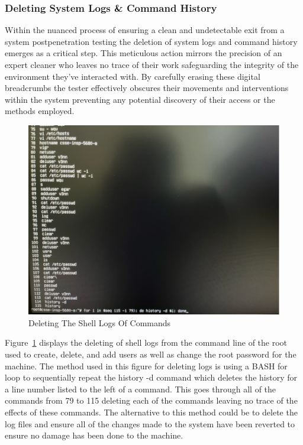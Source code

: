 \documentclass[manuscript,acmsmall,anonymous,review,screen,nonacm=true, authorversion=true]{acmart}
\begin{document}
\subsubsection{ Deleting System Logs \& Command History}
Within the nuanced process of ensuring a clean and undetectable exit from a system postpenetration testing the deletion of system logs and command history emerges as a critical step. This meticulous action mirrors the precision of an expert cleaner who leaves no trace of their
work safeguarding the integrity of the environment they've interacted with.  By carefully
erasing these digital breadcrumbs the tester effectively obscures their movements and
interventions within the system preventing any potential discovery of their access or the methods
employed.
\begin{figure}
    \centering
    \includegraphics{pict/Picture17.png}
    \caption{Deleting The Shell Logs Of Commands}
    \label{fig:17}
\end{figure}
Figure~\ref{fig:17} displays the deleting of shell logs from the command line of the root used to
create, delete, and add users as well as change the root password for the machine.
The method used in this figure for deleting logs is using a BASH for loop to sequentially repeat
the history -d command which deletes the history for a line number listed to the left of a
command. This goes through all of the commands from 79 to 115 deleting each of
the commands leaving no trace of the effects of these commands. The alternative to
this method could be to delete the log files and ensure all of the changes made to the system have
been reverted to ensure no damage has been done to the machine.
\end{document}
